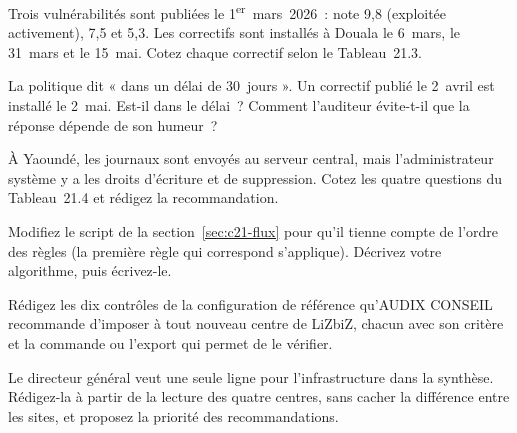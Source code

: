 \begin{boxexo}[title={\ding{45}\quad Exercice~21.5. CVSS et délais \niveaubase}]
Trois vulnérabilités sont publiées le 1\textsuperscript{er}~mars~2026~:
note 9,8 (exploitée activement), 7,5 et 5,3. Les correctifs sont installés
à Douala le 6~mars, le 31~mars et le 15~mai. Cotez chaque correctif selon le
Tableau~21.3.
\end{boxexo}

\begin{boxexo}[title={\ding{45}\quad Exercice~21.6. Le correctif du trentième jour \niveaumoyen}]
La politique dit « dans un délai de 30~jours ». Un correctif publié le
2~avril est installé le 2~mai. Est-il dans le délai~? Comment
l'auditeur évite-t-il que la réponse dépende de son humeur~?
\end{boxexo}

\begin{boxexo}[title={\ding{45}\quad Exercice~21.7. La journalisation \niveaumoyen}]
À Yaoundé, les journaux sont envoyés au serveur central, mais
l'administrateur système y a les droits d'écriture et de suppression.
Cotez les quatre questions du Tableau~21.4 et rédigez la recommandation.
\end{boxexo}

\begin{boxexo}[title={\ding{45}\quad Exercice~21.8. Le script de flux \niveaumoyen}]
Modifiez le script de la section~\ref{sec:c21-flux} pour qu'il tienne compte
de l'ordre des règles (la première règle qui correspond s'applique).
Décrivez votre algorithme, puis écrivez-le.
\end{boxexo}

\begin{boxexo}[title={\ding{45}\quad Exercice~21.9. Une configuration de référence \niveauexpert}]
Rédigez les dix contrôles de la configuration de référence qu'AUDIX
CONSEIL recommande d'imposer à tout nouveau centre de LiZbiZ, chacun avec
son critère et la commande ou l'export qui permet de le vérifier.
\end{boxexo}

\begin{boxexo}[title={\ding{45}\quad Exercice~21.10. Agréger ou non \niveauexpert}]
Le directeur général veut une seule ligne pour l'infrastructure dans la
synthèse. Rédigez-la à partir de la lecture des quatre centres, sans
cacher la différence entre les sites, et proposez la priorité des
recommandations.
\end{boxexo}

\bigskip

